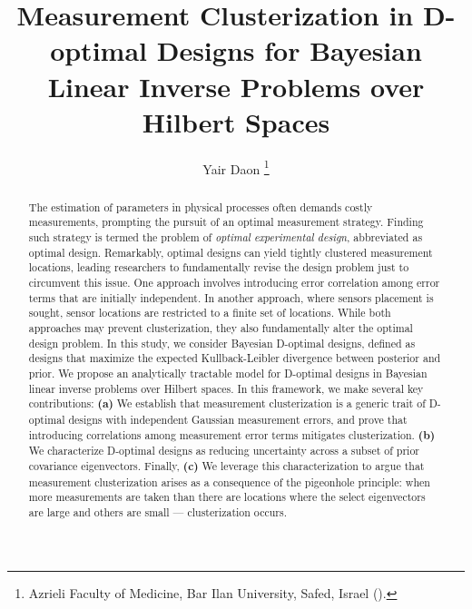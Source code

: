 \documentclass{siamonline220329}
\title{Measurement Clusterization in D-optimal Designs for Bayesian
  Linear Inverse Problems over Hilbert Spaces}
\author{Yair Daon \thanks{Azrieli Faculty of Medicine, Bar Ilan University, Safed,
      Israel (\email{yair.daon@gmail.com}).}}
\begin{document}
\maketitle

\begin{abstract}
The estimation of parameters in physical processes often demands
costly measurements, prompting the pursuit of an optimal measurement
strategy. Finding such strategy is termed the problem of \emph{optimal
experimental design}, abbreviated as optimal design. Remarkably,
optimal designs can yield tightly clustered measurement locations,
leading researchers to fundamentally revise the design problem just to
circumvent this issue. One approach involves introducing error
correlation among error terms that are initially independent. In
another approach, where sensors placement is sought, sensor locations
are restricted to a finite set of locations. While both approaches may
prevent clusterization, they also fundamentally alter the optimal
design problem.
%
In this study, we consider Bayesian D-optimal designs, defined as
designs that maximize the expected Kullback-Leibler divergence between
posterior and prior. We propose an analytically tractable model for
D-optimal designs in Bayesian linear inverse problems over Hilbert
spaces. In this framework, we make several key contributions:
\textbf{(a)} We establish that measurement clusterization is a generic
trait of D-optimal designs with independent Gaussian measurement
errors, and prove that introducing correlations among measurement
error terms mitigates clusterization. \textbf{(b)} We characterize
D-optimal designs as reducing uncertainty across a subset of prior
covariance eigenvectors. Finally, \textbf{(c)} We leverage this
characterization to argue that measurement clusterization arises as a
consequence of the pigeonhole principle: when more measurements are
taken than there are locations where the select eigenvectors are large
and others are small --- clusterization occurs.
%
\end{abstract}








\end{document}
